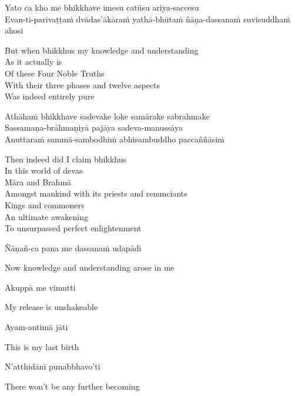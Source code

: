 Yato ca kho me bhikkhave imesu catūsu ariya-saccesu\\
Evan-ti-parivaṭṭaṁ dvādas’ākāraṁ yathā-bhūtaṁ ñāṇa-dassanaṁ suvisuddhaṁ ahosi

\begin{cprenglish}
But when bhikkhus my knowledge and understanding\\
As it actually is\\
Of these Four Noble Truths\\
With their three phases and twelve aspects\\
Was indeed entirely pure
\end{cprenglish}

Athāhaṁ bhikkhave sadevake loke samārake sabrahmake\\
Sassamaṇa-brāhmaṇiyā pajāya sadeva-manussāya\\
Anuttaraṁ sammā-sambodhiṁ abhisambuddho paccaññāsiṁ

\begin{cprenglish}
Then indeed did I claim bhikkhus\\
In this world of devas\\
Māra and Brahmā\\
Amongst mankind with its priests and renunciants\\
Kings and commoners\\
An ultimate awakening\\
To unsurpassed perfect enlightenment
\end{cprenglish}

Ñāṇañ-ca pana me dassanaṁ udapādi

\begin{cprenglish}
Now knowledge and understanding arose in me
\end{cprenglish}

Akuppā me vimutti

\begin{cprenglish}
My release is unshakeable
\end{cprenglish}

Ayam-antimā jāti

\begin{cprenglish}
This is my last birth
\end{cprenglish}

N’atthidāni punabbhavo’ti

\begin{cprenglish}
There won’t be any further becoming
\end{cprenglish}


